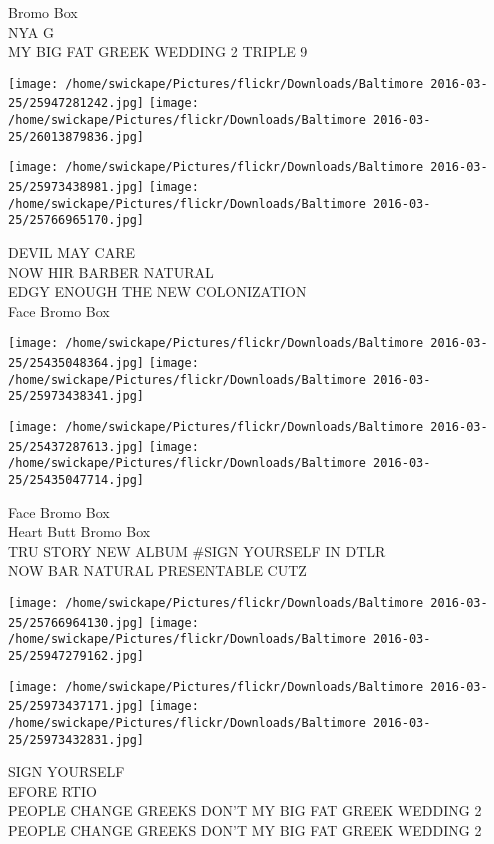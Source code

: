 \documentclass[10pt,letterpaper]{article}
\begin{document}
Bromo Box\\
NYA G\\
MY BIG FAT GREEK WEDDING 2 TRIPLE 9
\pagebreak

\texttt{[image: /home/swickape/Pictures/flickr/Downloads/Baltimore 2016-03-25/25947281242.jpg]}
\texttt{[image: /home/swickape/Pictures/flickr/Downloads/Baltimore 2016-03-25/26013879836.jpg]}

\texttt{[image: /home/swickape/Pictures/flickr/Downloads/Baltimore 2016-03-25/25973438981.jpg]}
\texttt{[image: /home/swickape/Pictures/flickr/Downloads/Baltimore 2016-03-25/25766965170.jpg]}

DEVIL MAY CARE\\
NOW HIR BARBER NATURAL\\
EDGY ENOUGH THE NEW COLONIZATION\\
Face Bromo Box
\pagebreak

\texttt{[image: /home/swickape/Pictures/flickr/Downloads/Baltimore 2016-03-25/25435048364.jpg]}
\texttt{[image: /home/swickape/Pictures/flickr/Downloads/Baltimore 2016-03-25/25973438341.jpg]}

\texttt{[image: /home/swickape/Pictures/flickr/Downloads/Baltimore 2016-03-25/25437287613.jpg]}
\texttt{[image: /home/swickape/Pictures/flickr/Downloads/Baltimore 2016-03-25/25435047714.jpg]}

Face Bromo Box\\
Heart Butt Bromo Box\\
TRU STORY NEW ALBUM \#SIGN YOURSELF IN DTLR\\
NOW BAR NATURAL PRESENTABLE CUTZ
\pagebreak

\texttt{[image: /home/swickape/Pictures/flickr/Downloads/Baltimore 2016-03-25/25766964130.jpg]}
\texttt{[image: /home/swickape/Pictures/flickr/Downloads/Baltimore 2016-03-25/25947279162.jpg]}

\texttt{[image: /home/swickape/Pictures/flickr/Downloads/Baltimore 2016-03-25/25973437171.jpg]}
\texttt{[image: /home/swickape/Pictures/flickr/Downloads/Baltimore 2016-03-25/25973432831.jpg]}

SIGN YOURSELF\\
EFORE RTIO\\
PEOPLE CHANGE GREEKS DON'T MY BIG FAT GREEK WEDDING 2\\
PEOPLE CHANGE GREEKS DON'T MY BIG FAT GREEK WEDDING 2
\pagebreak
\end{document}
